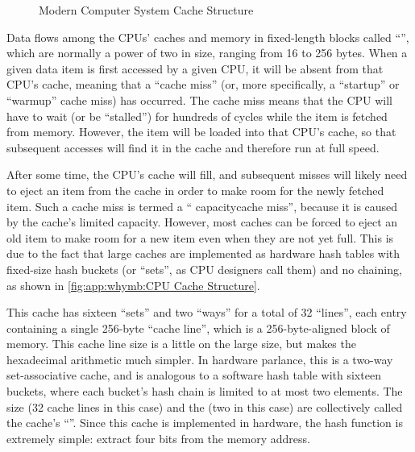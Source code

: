 \begin{figure}
\centering
{}
\caption{Modern Computer System Cache Structure}
\label{fig:app:whymb:Modern Computer System Cache Structure}
\end{figure}

Data flows among the CPUs' caches and memory in fixed-length blocks
called ``'', which are normally a power of two in size,
ranging from 16 to 256 bytes.
When a given data item is first accessed by a given CPU, it will
be absent from that CPU's cache, meaning that a ``cache miss''
(or, more specifically, a ``startup'' or ``warmup'' cache miss)
has occurred.
The cache miss means that the CPU will
have to wait (or be ``stalled'') for hundreds of cycles while the
item is fetched from memory.
However, the item will be loaded into that CPU's cache, so that
subsequent accesses will find it in the cache and therefore run
at full speed.

After some time, the CPU's cache will fill, and subsequent
misses will likely need to eject an item from the cache in order
to make room for the newly fetched item.
Such a cache miss is termed a ``
{capacity}{cache miss}'', because it is caused
by the cache's limited capacity.
However, most caches can be forced to eject an old item to make room
for a new item even when they are not yet full.
This is due to the fact that large caches are implemented as hardware
hash tables with fixed-size hash buckets (or ``sets'', as CPU designers
call them) and no chaining, as shown in
\cref{fig:app:whymb:CPU Cache Structure}.

This cache has sixteen ``sets'' and two ``ways'' for a total of 32
``lines'', each entry containing a single 256-byte ``cache line'',
which is a 256-byte-aligned block of memory.
This cache line size is a little on the large size, but makes the hexadecimal
arithmetic much simpler.
In hardware parlance, this is a two-way set-associative cache, and
is analogous to a software hash table with
sixteen buckets, where each bucket's hash chain is limited to
at most two elements.
The size (32 cache lines in this case) and the
 (two in
this case) are collectively called the cache's
``''.
Since this cache is implemented in hardware, the hash function is
extremely simple: extract four bits from the memory address.

